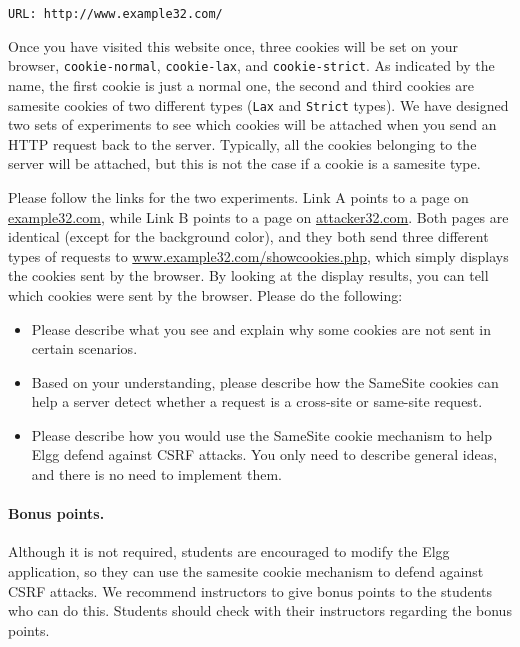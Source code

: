 \begin{lstlisting}
URL: http://www.example32.com/
\end{lstlisting}

Once you have visited this website once, three cookies will be 
set on your browser, \texttt{cookie-normal}, \texttt{cookie-lax},
and \texttt{cookie-strict}. As indicated by the name,
the first cookie is just a normal one, the second and third cookies
are samesite cookies of two different types (\texttt{Lax} and \texttt{Strict}
types). We have designed two sets of experiments to see 
which cookies will be attached when you send an HTTP request
back to the server. Typically, all the cookies belonging to the server
will be attached, but this is not the case if a cookie is a samesite type. 


Please follow the links for the two experiments. Link A points to a page 
on \url{example32.com}, while Link B points to a page 
on \url{attacker32.com}. Both pages are identical (except for the background
color), and they both send three different types of requests to
\url{www.example32.com/showcookies.php}, which
simply displays the cookies sent by the browser. By looking 
at the display results, you can tell which cookies were sent 
by the browser. Please do the following: 


\begin{itemize}
\item Please describe what you see and explain why some cookies are 
not sent in certain scenarios. 
 
\item Based on your understanding, please describe how the SameSite
cookies can help a server detect whether a request 
is a cross-site or same-site request. 

\item Please describe how you would use
the SameSite cookie mechanism to help Elgg defend against CSRF attacks. 
You only need to describe general ideas, and there is no need to 
implement them. 
\end{itemize}


\paragraph{Bonus points.} Although it is not required, students
are encouraged to modify the Elgg application, so they
can use the samesite cookie mechanism to defend against
CSRF attacks. We recommend instructors to give bonus points 
to the students who can do this. Students should check with 
their instructors regarding the bonus points.


